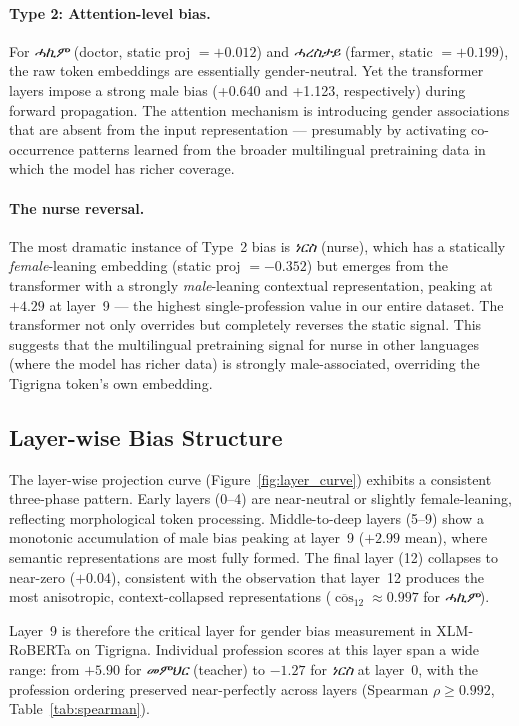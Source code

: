 \paragraph{Type 2: Attention-level bias.}
For \textit{ሓኪም} (doctor, static proj $= +0.012$) and \textit{ሓረስታይ}
(farmer, static $= +0.199$), the raw token embeddings are essentially gender-neutral.
Yet the transformer layers impose a strong male bias (+0.640 and +1.123,
respectively) during forward propagation. The attention mechanism is introducing
gender associations that are absent from the input representation — presumably
by activating co-occurrence patterns learned from the broader multilingual
pretraining data in which the model has richer coverage.

\paragraph{The nurse reversal.}
The most dramatic instance of Type~2 bias is \textit{ነርስ} (nurse), which has a
statically \emph{female}-leaning embedding (static proj $= -0.352$) but
emerges from the transformer with a strongly \emph{male}-leaning contextual
representation, peaking at $+4.29$ at layer~9 — the highest single-profession
value in our entire dataset. The transformer not only overrides but completely
reverses the static signal. This suggests that the multilingual pretraining
signal for nurse in other languages (where the model has richer data) is
strongly male-associated, overriding the Tigrigna token's own embedding.

\subsection{Layer-wise Bias Structure}

The layer-wise projection curve (Figure~\ref{fig:layer_curve}) exhibits a
consistent three-phase pattern. Early layers (0--4) are near-neutral or
slightly female-leaning, reflecting morphological token processing. Middle-to-deep
layers (5--9) show a monotonic accumulation of male bias peaking at layer~9
($+2.99$ mean), where semantic representations are most fully formed.
The final layer (12) collapses to near-zero ($+0.04$), consistent with the
observation that layer~12 produces the most anisotropic, context-collapsed
representations ($\overline{\cos}_{12} \approx 0.997$ for \textit{ሓኪም}).

Layer~9 is therefore the critical layer for gender bias measurement in
XLM-RoBERTa on Tigrigna. Individual profession scores at this layer span
a wide range: from $+5.90$ for \textit{መምህር} (teacher) to $-1.27$ for
\textit{ነርስ} at layer~0, with the profession ordering preserved near-perfectly
across layers (Spearman $\rho \geq 0.992$, Table~\ref{tab:spearman}).

